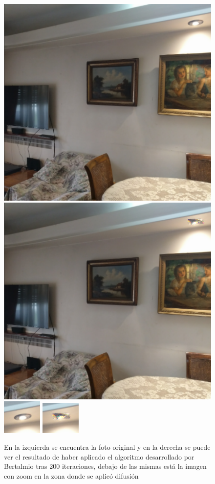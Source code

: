 \documentclass[assd_tpf_lineasinvest.tex]{subfiles}
\begin{document}
\begin{figure}[H]
\begin{centering}
\includegraphics[scale=0.38]{image0.png}
\includegraphics[scale=0.38]{image150.png}
\includegraphics[scale=2.4]{image0_zoom.png}
\includegraphics[scale=2.5]{image150_zoom.png}
\par\end{centering}
\caption{En la izquierda se encuentra la foto original y en la derecha se puede ver el resultado de haber aplicado el algoritmo desarrollado por Bertalmio tras 200 iteraciones, debajo de las mismas está la imagen con zoom en la zona donde se aplicó difusión}


\end{figure}
\end{document}
